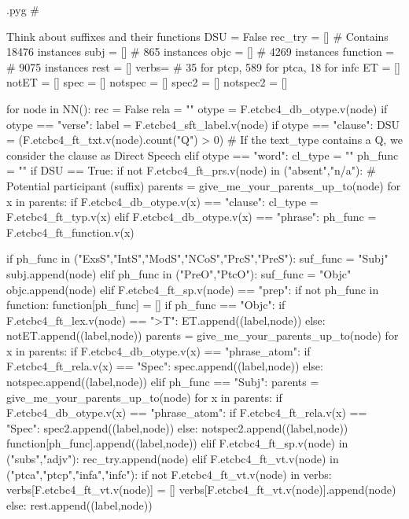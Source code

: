 \documentclass{report}
\makeatletter
\newenvironment{python}{%
  \VerbatimEnvironment
  \minted@resetoptions
  \setkeys{minted@opt}{}
      \begin{VerbatimOut}{\jobname.pyg}}
{%
      \end{VerbatimOut}
      \minted@pygmentize{python}
      \DeleteFile{\jobname.pyg}}
\makeatother
\begin{document}
\begin{python}
#{{{ Think about suffixes and their functions
DSU = False
rec_try = []    # Contains 18476 instances
subj = []       # 865 instances
objc = []       # 4269 instances
function = {}   # 9075 instances
rest = []
verbs= {}       # 35 for ptcp, 589 for ptca, 18 for infc
ET = []
notET = []
spec = []
notspec = []
spec2 = []
notspec2 = []

for node in NN():
    rec = False
    rela = ""
    otype = F.etcbc4_db_otype.v(node)
    if otype == "verse":
        label = F.etcbc4_sft_label.v(node)
    if otype == "clause":
        DSU = (F.etcbc4_ft_txt.v(node).count("Q") > 0)    # If the text_type contains a Q, we consider the clause as Direct Speech
    elif otype == "word":
        cl_type = ""
        ph_func = ""
        if DSU == True:
            if not F.etcbc4_ft_prs.v(node) in ("absent","n/a"):    # Potential participant (suffix)
                parents = give_me_your_parents_up_to(node)
                for x in parents:
                    if F.etcbc4_db_otype.v(x) == "clause":
                        cl_type = F.etcbc4_ft_typ.v(x)
                    elif F.etcbc4_db_otype.v(x) == "phrase":
                        ph_func = F.etcbc4_ft_function.v(x)

                if ph_func in ("ExsS","IntS","ModS","NCoS","PrcS","PreS"):
                    suf_func = "Subj"
                    subj.append(node)
                elif ph_func in ("PreO","PtcO"):
                    suf_func = "Objc"
                    objc.append(node)
                elif F.etcbc4_ft_sp.v(node) == "prep":
                    if not ph_func in function:
                        function[ph_func] = []
                    if ph_func == "Objc":
                        if F.etcbc4_ft_lex.v(node) == ">T":
                            ET.append((label,node))
                        else:
                            notET.append((label,node))
                        parents = give_me_your_parents_up_to(node)
                        for x in parents:
                            if F.etcbc4_db_otype.v(x) == "phrase_atom":
                                if F.etcbc4_ft_rela.v(x) == "Spec":
                                    spec.append((label,node))
                                else:
                                    notspec.append((label,node))
                    elif ph_func == "Subj":
                        parents = give_me_your_parents_up_to(node)
                        for x in parents:
                            if F.etcbc4_db_otype.v(x) == "phrase_atom":
                                if F.etcbc4_ft_rela.v(x) == "Spec":
                                    spec2.append((label,node))
                                else:
                                    notspec2.append((label,node))
                    function[ph_func].append((label,node))
                elif F.etcbc4_ft_sp.v(node) in ("subs","adjv"):
                    rec_try.append(node)
                elif F.etcbc4_ft_vt.v(node) in ("ptca","ptcp","infa","infc"):
                    if not F.etcbc4_ft_vt.v(node) in verbs:
                        verbs[F.etcbc4_ft_vt.v(node)] = []
                    verbs[F.etcbc4_ft_vt.v(node)].append(node)
                else:
                    rest.append((label,node))

}}}
\end{python}
\end{document}

